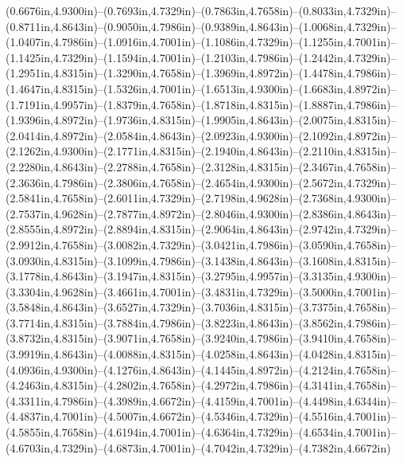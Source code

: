 (0.6676in,4.9300in)--(0.7693in,4.7329in)--(0.7863in,4.7658in)--(0.8033in,4.7329in)--(0.8711in,4.8643in)--(0.9050in,4.7986in)--(0.9389in,4.8643in)--(1.0068in,4.7329in)--(1.0407in,4.7986in)--(1.0916in,4.7001in)--(1.1086in,4.7329in)--(1.1255in,4.7001in)--(1.1425in,4.7329in)--(1.1594in,4.7001in)--(1.2103in,4.7986in)--(1.2442in,4.7329in)--(1.2951in,4.8315in)--(1.3290in,4.7658in)--(1.3969in,4.8972in)--(1.4478in,4.7986in)--(1.4647in,4.8315in)--(1.5326in,4.7001in)--(1.6513in,4.9300in)--(1.6683in,4.8972in)--(1.7191in,4.9957in)--(1.8379in,4.7658in)--(1.8718in,4.8315in)--(1.8887in,4.7986in)--(1.9396in,4.8972in)--(1.9736in,4.8315in)--(1.9905in,4.8643in)--(2.0075in,4.8315in)--(2.0414in,4.8972in)--(2.0584in,4.8643in)--(2.0923in,4.9300in)--(2.1092in,4.8972in)--(2.1262in,4.9300in)--(2.1771in,4.8315in)--(2.1940in,4.8643in)--(2.2110in,4.8315in)--(2.2280in,4.8643in)--(2.2788in,4.7658in)--(2.3128in,4.8315in)--(2.3467in,4.7658in)--(2.3636in,4.7986in)--(2.3806in,4.7658in)--(2.4654in,4.9300in)--(2.5672in,4.7329in)--(2.5841in,4.7658in)--(2.6011in,4.7329in)--(2.7198in,4.9628in)--(2.7368in,4.9300in)--(2.7537in,4.9628in)--(2.7877in,4.8972in)--(2.8046in,4.9300in)--(2.8386in,4.8643in)--(2.8555in,4.8972in)--(2.8894in,4.8315in)--(2.9064in,4.8643in)--(2.9742in,4.7329in)--(2.9912in,4.7658in)--(3.0082in,4.7329in)--(3.0421in,4.7986in)--(3.0590in,4.7658in)--(3.0930in,4.8315in)--(3.1099in,4.7986in)--(3.1438in,4.8643in)--(3.1608in,4.8315in)--(3.1778in,4.8643in)--(3.1947in,4.8315in)--(3.2795in,4.9957in)--(3.3135in,4.9300in)--(3.3304in,4.9628in)--(3.4661in,4.7001in)--(3.4831in,4.7329in)--(3.5000in,4.7001in)--(3.5848in,4.8643in)--(3.6527in,4.7329in)--(3.7036in,4.8315in)--(3.7375in,4.7658in)--(3.7714in,4.8315in)--(3.7884in,4.7986in)--(3.8223in,4.8643in)--(3.8562in,4.7986in)--(3.8732in,4.8315in)--(3.9071in,4.7658in)--(3.9240in,4.7986in)--(3.9410in,4.7658in)--(3.9919in,4.8643in)--(4.0088in,4.8315in)--(4.0258in,4.8643in)--(4.0428in,4.8315in)--(4.0936in,4.9300in)--(4.1276in,4.8643in)--(4.1445in,4.8972in)--(4.2124in,4.7658in)--(4.2463in,4.8315in)--(4.2802in,4.7658in)--(4.2972in,4.7986in)--(4.3141in,4.7658in)--(4.3311in,4.7986in)--(4.3989in,4.6672in)--(4.4159in,4.7001in)--(4.4498in,4.6344in)--(4.4837in,4.7001in)--(4.5007in,4.6672in)--(4.5346in,4.7329in)--(4.5516in,4.7001in)--(4.5855in,4.7658in)--(4.6194in,4.7001in)--(4.6364in,4.7329in)--(4.6534in,4.7001in)--(4.6703in,4.7329in)--(4.6873in,4.7001in)--(4.7042in,4.7329in)--(4.7382in,4.6672in) 